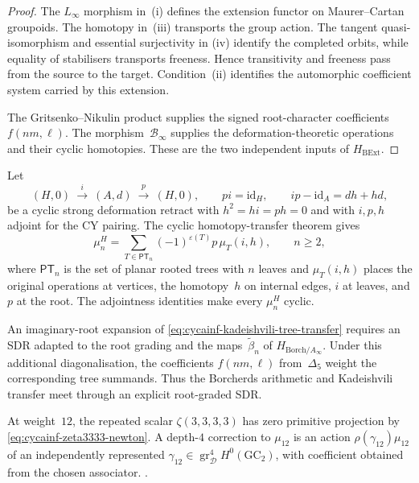 \begin{proof}
The $L_\infty$ morphism in~(i) defines the extension functor on
Maurer--Cartan groupoids.  The homotopy in~(iii) transports the group
action.  The tangent quasi-isomorphism and essential surjectivity in
(iv) identify the completed orbits, while equality of stabilisers
transports freeness.  Hence transitivity and freeness pass from the
source to the target.  Condition~(ii) identifies the automorphic
coefficient system carried by this extension.

The Gritsenko--Nikulin product supplies the signed root-character
coefficients~$f(nm,\ell)$.  The morphism~$\mathcal B_\infty$ supplies
the deformation-theoretic operations and their cyclic homotopies.
These are the two independent inputs of $H_{\mathrm{BExt}}$.
\end{proof}

\begin{remark}
\label{rem:cycainf-kadeishvili-higher-mu}
Let
\[
 (H,0)
 \ \xrightarrow{\ i\ }\ (A,d)
 \ \xrightarrow{\ p\ }\ (H,0),
 \qquad
 pi=\mathrm{id}_H,\qquad
 ip-\mathrm{id}_A=dh+hd,
\]
be a cyclic strong deformation retract with
$h^2=hi=ph=0$ and with $i,p,h$ adjoint for the CY pairing.  The cyclic
homotopy-transfer theorem gives
\begin{equation}
\label{eq:cycainf-kadeishvili-tree-transfer}
 \mu_n^H
 =
 \sum_{T\in\mathsf{PT}_n}
 (-1)^{\varepsilon(T)}
 p\,\mu_T(i,h),
 \qquad n\geq2,
\end{equation}
where $\mathsf{PT}_n$ is the set of planar rooted trees with $n$
leaves and $\mu_T(i,h)$ places the original operations at vertices,
the homotopy~$h$ on internal edges, $i$ at leaves, and $p$ at the
root.  The adjointness identities make every
$\mu_n^H$ cyclic.

An imaginary-root expansion of
\eqref{eq:cycainf-kadeishvili-tree-transfer} requires an SDR adapted
to the root grading and the maps~$\widetilde\beta_n$ of
$H_{\mathrm{Borch}/A_\infty}$.  Under this additional diagonalisation,
the coefficients $f(nm,\ell)$ from~$\Delta_5$ weight the corresponding
tree summands.  Thus the Borcherds arithmetic and Kadeishvili transfer
meet through an explicit root-graded SDR.

At weight~$12$, the repeated scalar
$\zeta(3,3,3,3)$ has zero primitive projection by
\eqref{eq:cycainf-zeta3333-newton}.  A depth-$4$ correction to
$\mu_{12}$ is an action
$\rho(\gamma_{12})\mu_{12}$ of an independently represented
$\gamma_{12}\in\operatorname{gr}_{\mathcal D}^4H^0(\mathrm{GC}_2)$,
with coefficient obtained from the chosen associator.
\cite{Kadeishvili1982,KontsevichSoibelman2009,GritsenkoNikulin1998,
 Willwacher2015}.
\end{remark}

